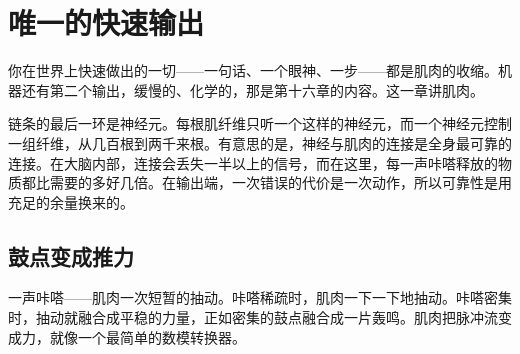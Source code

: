 \chapter{唯一的快速输出}

你在世界上快速做出的一切——一句话、一个眼神、一步——都是肌肉的收缩。机器还有第二个输出，缓慢的、化学的，那是第十六章的内容。这一章讲肌肉。

链条的最后一环是神经元。每根肌纤维只听一个这样的神经元，而一个神经元控制一组纤维，从几百根到两千来根。有意思的是，神经与肌肉的连接是全身最可靠的连接。在大脑内部，连接会丢失一半以上的信号，而在这里，每一声咔嗒释放的物质都比需要的多好几倍。在输出端，一次错误的代价是一次动作，所以可靠性是用充足的余量换来的。

\section*{鼓点变成推力}

一声咔嗒——肌肉一次短暂的抽动。咔嗒稀疏时，肌肉一下一下地抽动。咔嗒密集时，抽动就融合成平稳的力量，正如密集的鼓点融合成一片轰鸣。肌肉把脉冲流变成力，就像一个最简单的数模转换器。

